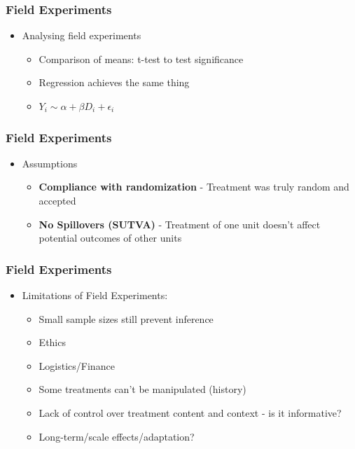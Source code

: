 \documentclass[xcolor=x11names,compress]{beamer}\usepackage[]{graphicx}\usepackage[]{xcolor}
\renewcommand{\(}{\begin{columns}}
\renewcommand{\)}{\end{columns}}
\newcommand{\<}[1]{\begin{column}{#1}}
\renewcommand{\>}{\end{column}}
\begin{document}
\begin{frame}
\frametitle{Field Experiments}
\begin{itemize}
\item Analysing field experiments
\begin{itemize}
\item Comparison of means: t-test to test significance
\item Regression achieves the same thing
\item $Y_i \sim \alpha + \beta D_i + \epsilon_i$ 
\end{itemize}
\end{itemize}
\end{frame}

\begin{frame}
\frametitle{Field Experiments}
\begin{itemize}
\item Assumptions
\begin{itemize}
\item \textbf{Compliance with randomization} - Treatment was truly random and accepted
\item \textbf{No Spillovers (SUTVA)} - Treatment of one unit doesn't affect potential outcomes of other units
\end{itemize}
\end{itemize}
\end{frame}

\begin{frame}
\frametitle{Field Experiments}
\begin{itemize}
\item Limitations of Field Experiments: 
\pause
\begin{itemize}
\item Small sample sizes still prevent inference
\item Ethics
\item Logistics/Finance
\item Some treatments can't be manipulated (history)
\item Lack of control over treatment content and context - is it informative?
\item Long-term/scale effects/adaptation?
\end{itemize}
\end{itemize}
\end{frame}
\end{document}
